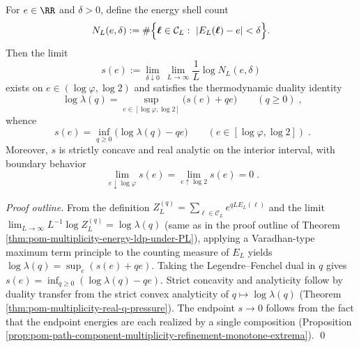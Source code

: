 \begin{theorem}\label{thm:pom-multiplicity-microcanonical-entropy}
For \(e\in\RR\) and \(\delta>0\), define the energy shell count
\[
N_L(e,\delta):=\#\Bigl\{\boldsymbol{\ell}\in\mathcal{C}_L:\ |E_L(\boldsymbol{\ell})-e|<\delta\Bigr\}.
\]
Then the limit
\[
s(e):=\lim_{\delta\downarrow 0}\ \lim_{L\to\infty}\frac{1}{L}\log N_L(e,\delta)
\]
exists on \(e\in(\log\varphi,\log 2)\) and satisfies the thermodynamic duality identity
\[
\boxed{\;
\log\lambda(q)=\sup_{e\in[\log\varphi,\log 2]}\bigl(s(e)+q e\bigr)\qquad(q\ge 0)\; } ,
\]
whence
\[
\boxed{\;
s(e)=\inf_{q\ge 0}\bigl(\log\lambda(q)-q e\bigr)\qquad(e\in[\log\varphi,\log 2])\; } .
\]
Moreover, \(s\) is strictly concave and real analytic on the interior interval, with boundary behavior
\[
\boxed{\;
\lim_{e\downarrow \log\varphi}s(e)=\lim_{e\uparrow \log 2}s(e)=0\; } .
\]
\end{theorem}
\begin{proof}[Proof outline]
From the definition \(Z_L^{(q)}=\sum_{\boldsymbol{\ell}\in\mathcal{C}_L}e^{qLE_L(\boldsymbol{\ell})}\) and the limit
\(
\lim_{L\to\infty}L^{-1}\log Z_L^{(q)}=\log\lambda(q)
\)
(same as in the proof outline of Theorem \ref{thm:pom-multiplicity-energy-ldp-under-PL}), applying a Varadhan-type maximum term principle to the counting measure of \(E_L\) yields
\(
\log\lambda(q)=\sup_e(s(e)+q e)
\).
Taking the Legendre--Fenchel dual in \(q\) gives \(s(e)=\inf_{q\ge 0}(\log\lambda(q)-q e)\).
Strict concavity and analyticity follow by duality transfer from the strict convex analyticity of \(q\mapsto\log\lambda(q)\) (Theorem \ref{thm:pom-multiplicity-real-q-pressure}).
The endpoint \(s\to 0\) follows from the fact that the endpoint energies are each realized by a single composition (Proposition \ref{prop:pom-path-component-multiplicity-refinement-monotone-extrema}). \qed
\end{proof}

